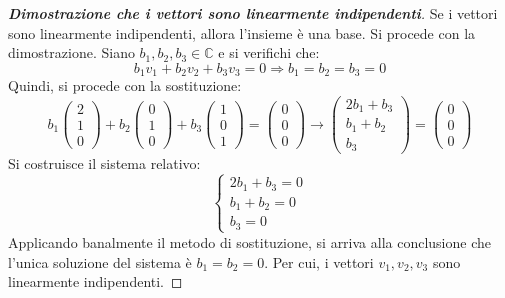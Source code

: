 \documentclass[a4paper]{article}
\begin{document}
	\begin{proof}[\textbf{Dimostrazione che i vettori sono linearmente indipendenti}]
		Se i vettori sono linearmente indipendenti, allora l'insieme è una base. Si procede con la dimostrazione. Siano $b_{1}, b_{2}, b_{3} \in \mathbb{C}$ e si verifichi che:
		\begin{equation*}
			b_{1}v_{1} + b_{2}v_{2} + b_{3}v_{3} = 0 \Rightarrow b_{1} = b_{2} = b_{3} = 0
		\end{equation*}
		Quindi, si procede con la sostituzione:
		\begin{equation*}
			b_{1} \begin{pmatrix}
				2 \\ 1 \\ 0
			\end{pmatrix} + b_{2} \begin{pmatrix}
				0 \\ 1 \\ 0
			\end{pmatrix} + b_{3} \begin{pmatrix}
				1 \\ 0 \\ 1
			\end{pmatrix} = \begin{pmatrix}
				0 \\ 0 \\ 0
			\end{pmatrix} \longrightarrow
			\begin{pmatrix}
				2b_{1} + b_{3} \\
				b_{1}  + b_{2} \\
				b_{3}
			\end{pmatrix} = \begin{pmatrix}
				0 \\ 0 \\ 0
			\end{pmatrix}
		\end{equation*}
		Si costruisce il sistema relativo:
		\begin{equation*}
			\begin{cases}
				2b_{1} + b_{3} = 0 \\
				b_{1}  + b_{2} = 0 \\
				b_{3} = 0
			\end{cases}
		\end{equation*}
		Applicando banalmente il metodo di sostituzione, si arriva alla conclusione che l'unica soluzione del sistema è $b_{1} = b_{2} = 0$. Per cui, i vettori $v_{1}, v_{2}, v_{3}$ sono linearmente indipendenti.
	\end{proof} \:\newline
	
\end{document}
